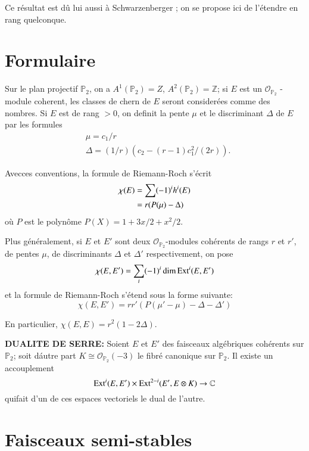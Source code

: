 Ce r\'esultat est d\^u lui aussi \`a
Schwarzenberger \cite{chap5-key4}; on se propose ici de l'\'etendre en
rang quelconque.

\section{Formulaire}\label{chap5-sec2}

Sur le plan projectif $\mathbb{P}_{2}$, on a
$A^{1}(\mathbb{P}_{2})=Z$, $A^{2}(\mathbb{P}_{2})=\mathbb{Z}$; si $E$
est un $\mathscr{O}_{\mathbb{P}_{2}}$ - module coherent, les classes
de chern de $E$ seront consider\'ees comme des nombres. Si $E$ est de
rang $>0$, on definit la pente $\mu$ et le discriminant $\Delta$ de
$E$ par les formules 
\begin{align*}
& \mu=c_{1}/r\\
& \Delta=(1/r)(c_{2}-(r-1)c^{2}_{1}/(2r)).
\end{align*}

Avec\pageoriginale ces conventions, la formule de Riemann-Roch
s'\'ecrit
\begin{align}
\chi(E) &=\sum(-1)^{i}h^{i}(E)\notag\\
&= r(P(\mu)-\Delta)\label{chap5-eq2.1}
\end{align}
o\`u $P$ est le polyn\^ome $P(X)=1+3x/2+x^{2}/2$.

Plus g\'en\'eralement, si $E$ et $E'$ sont deux
$\mathscr{O}_{\mathbb{P}_{2}}$-modules coh\'erents de rangs $r$ et
$r'$, de pentes $\mu$, de discriminants $\Delta$ et $\Delta'$
respectivement, on pose
$$
\chi(E,E')=\sum_{i}(-1)^{i}\dim \operatorname{Ext}^{i}(E,E')
$$
et la formule de Riemann-Roch s'\'etend sous la forme suivante:
\begin{equation}
\chi(E,E')=rr'(P(\mu'-\mu)-\Delta-\Delta')\label{chap5-eq2.2}
\end{equation}

En particulier, $\chi(E,E)=r^{2}(1-2\Delta)$.

\smallskip
\noindent
{\bf DUALITE DE SERRE:} Soient $E$ et $E'$ des faisceaux alg\'ebriques\break
coh\'erents sur $\mathbb{P}_{2}$; soit d\'autre part
$K\cong \mathscr{O}_{\mathbb{P}_{2}}(-3)$ le fibr\'e canonique sur
$\mathbb{P}_{2}$. Il existe un accouplement
$$
\operatorname{Ext}^{i}(E,E')\times \operatorname{Ext}^{2-i}(E',E\otimes K)\to \mathbb{C}
$$
qui\pageoriginale fait d'un de ces espaces vectoriels le dual de
l'autre.

\section{Faisceaux semi-stables}\label{chap5-sec3}

